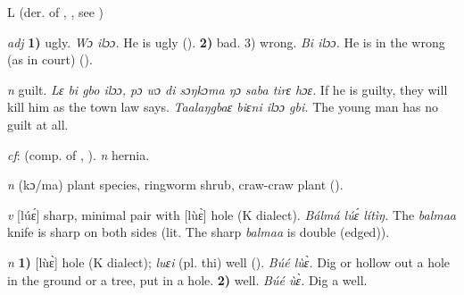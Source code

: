 \begin{letter}{L}
 (der. of , , see ) 

 \textit{adj} \textbf{1)} ugly. \textit{Wɔ ilɔɔ.} He is ugly (\citealt{Pichl1967}). \textbf{2)} bad. 3) wrong. \textit{Bi ilɔɔ.} He is in the wrong (as in court) (\citealt{Pichl1967}).

 \textit{n} guilt. \textit{Lɛ bi gbo ilɔɔ, pɔ wɔ di sɔŋkɔma ŋɔ saba tirɛ hɔɛ.} If he is guilty, they will kill him as the town law says. \textit{Taalaŋgbaɛ biɛni ilɔɔ gbi.} The young man has no guilt at all.

 \textit{cf}:  (comp. of , ). \textit{n} hernia.

 \textit{n} (kɔ/ma) plant species, ringworm shrub, craw-craw plant (\citealt{Pichl1967}). 

 \textit{v} [lúɛ́] sharp, minimal pair with [lùɛ̀] hole (K dialect). \textit{Bálmá lúɛ́ lítìŋ.} The \textit{balmaa} knife is sharp on both sides (lit. The sharp \textit{balmaa} is double (edged)).

 \textit{n} \textbf{1)} [lùɛ̀] hole (K dialect); \textit{luɛi} (pl. thi) well (\citealt{Sumner1921}). \textit{Búé lùɛ̀.} Dig or hollow out a hole in the ground or a tree, put in a hole. \textbf{2)} well. \textit{Búé ùɛ̀.} Dig a well.



\end{letter}
